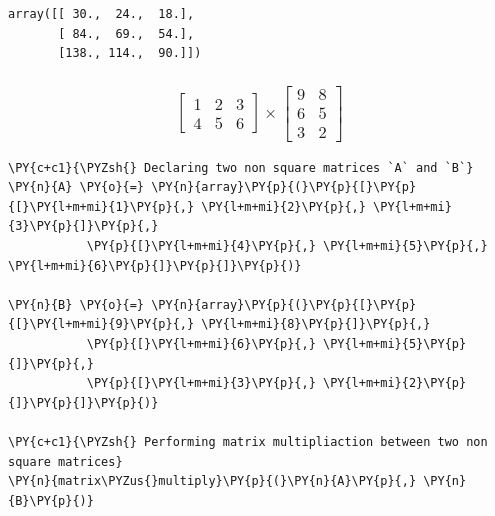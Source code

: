             \begin{tcolorbox}[breakable, size=fbox, boxrule=.5pt, pad at break*=1mm, opacityfill=0]
\begin{Verbatim}[commandchars=\\\{\}]
array([[ 30.,  24.,  18.],
       [ 84.,  69.,  54.],
       [138., 114.,  90.]])
\end{Verbatim}
\end{tcolorbox}
        
    \hypertarget{beginbmatrix-1-2-3-4-5-6-endbmatrix-times-beginbmatrix-9-8-6-5-3-2-endbmatrix}{%
\subsubsection{\texorpdfstring{\[\begin{bmatrix} 1 & 2 & 3 \\ 4 & 5 & 6 \end{bmatrix} \times \begin{bmatrix} 9 & 8 \\ 6 & 5 \\ 3 & 2 \end{bmatrix}\]}{\textbackslash begin\{bmatrix\} 1 \& 2 \& 3 \textbackslash\textbackslash{} 4 \& 5 \& 6 \textbackslash end\{bmatrix\} \textbackslash times \textbackslash begin\{bmatrix\} 9 \& 8 \textbackslash\textbackslash{} 6 \& 5 \textbackslash\textbackslash{} 3 \& 2 \textbackslash end\{bmatrix\}}}\label{beginbmatrix-1-2-3-4-5-6-endbmatrix-times-beginbmatrix-9-8-6-5-3-2-endbmatrix}}

    \begin{tcolorbox}[breakable, size=fbox, boxrule=1pt, pad at break*=1mm,colback=cellbackground, colframe=cellborder]
\begin{Verbatim}[commandchars=\\\{\}]
\PY{c+c1}{\PYZsh{} Declaring two non square matrices `A` and `B`}
\PY{n}{A} \PY{o}{=} \PY{n}{array}\PY{p}{(}\PY{p}{[}\PY{p}{[}\PY{l+m+mi}{1}\PY{p}{,} \PY{l+m+mi}{2}\PY{p}{,} \PY{l+m+mi}{3}\PY{p}{]}\PY{p}{,}
           \PY{p}{[}\PY{l+m+mi}{4}\PY{p}{,} \PY{l+m+mi}{5}\PY{p}{,} \PY{l+m+mi}{6}\PY{p}{]}\PY{p}{]}\PY{p}{)}

\PY{n}{B} \PY{o}{=} \PY{n}{array}\PY{p}{(}\PY{p}{[}\PY{p}{[}\PY{l+m+mi}{9}\PY{p}{,} \PY{l+m+mi}{8}\PY{p}{]}\PY{p}{,}
           \PY{p}{[}\PY{l+m+mi}{6}\PY{p}{,} \PY{l+m+mi}{5}\PY{p}{]}\PY{p}{,}
           \PY{p}{[}\PY{l+m+mi}{3}\PY{p}{,} \PY{l+m+mi}{2}\PY{p}{]}\PY{p}{]}\PY{p}{)}

\PY{c+c1}{\PYZsh{} Performing matrix multipliaction between two non square matrices}
\PY{n}{matrix\PYZus{}multiply}\PY{p}{(}\PY{n}{A}\PY{p}{,} \PY{n}{B}\PY{p}{)}
\end{Verbatim}
\end{tcolorbox}

